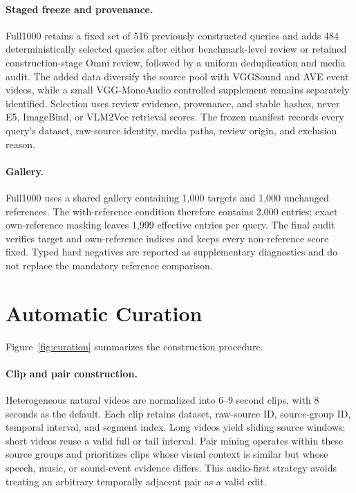 \documentclass[letterpaper]{article}
\begin{document}
\paragraph{Staged freeze and provenance.}
Full1000 retains a fixed set of 516 previously constructed queries and adds 484 deterministically selected queries after either benchmark-level review or retained construction-stage Omni review, followed by a uniform deduplication and media audit.
The added data diversify the source pool with VGGSound \cite{chen2020vggsound} and AVE \cite{tian2018ave} event videos, while a small VGG-MonoAudio controlled supplement remains separately identified.
Selection uses review evidence, provenance, and stable hashes, never E5, ImageBind, or VLM2Vec retrieval scores.
The frozen manifest records every query's dataset, raw-source identity, media paths, review origin, and exclusion reason.

\paragraph{Gallery.}
Full1000 uses a shared gallery containing 1,000 targets and 1,000 unchanged references.
The with-reference condition therefore contains 2,000 entries; exact own-reference masking leaves 1,999 effective entries per query.
The final audit verifies target and own-reference indices and keeps every non-reference score fixed.
Typed hard negatives are reported as supplementary diagnostics and do not replace the mandatory reference comparison.

\section{Automatic Curation}

Figure~\ref{fig:curation} summarizes the construction procedure.

\paragraph{Clip and pair construction.}
Heterogeneous natural videos are normalized into 6--9 second clips, with 8 seconds as the default.
Each clip retains dataset, raw-source ID, source-group ID, temporal interval, and segment index.
Long videos yield sliding source windows; short videos reuse a valid full or tail interval.
Pair mining operates within these source groups and prioritizes clips whose visual context is similar but whose speech, music, or sound-event evidence differs.
This audio-first strategy avoids treating an arbitrary temporally adjacent pair as a valid edit.
\end{document}
